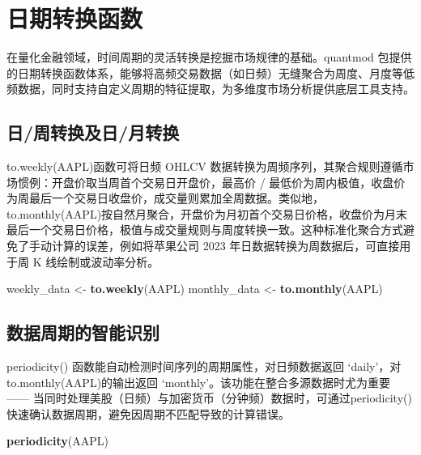 \documentclass[]{ctexbook}
\newenvironment{Shaded}{\begin{snugshade}}{\end{snugshade}}
\newcommand{\FunctionTok}[1]{\textcolor[rgb]{0.13,0.29,0.53}{\textbf{#1}}}
\newcommand{\NormalTok}[1]{#1}
\newcommand{\OtherTok}[1]{\textcolor[rgb]{0.56,0.35,0.01}{#1}}
\begin{document}
\section{日期转换函数}\label{ux65e5ux671fux8f6cux6362ux51fdux6570}

在量化金融领域，时间周期的灵活转换是挖掘市场规律的基础。quantmod 包提供的日期转换函数体系，能够将高频交易数据（如日频）无缝聚合为周度、月度等低频数据，同时支持自定义周期的特征提取，为多维度市场分析提供底层工具支持。

\subsection{日/周转换及日/月转换}\label{ux65e5ux5468ux8f6cux6362ux53caux65e5ux6708ux8f6cux6362}

to.weekly(AAPL)函数可将日频 OHLCV 数据转换为周频序列，其聚合规则遵循市场惯例：开盘价取当周首个交易日开盘价，最高价 / 最低价为周内极值，收盘价为周最后一个交易日收盘价，成交量则累加全周数据。类似地，to.monthly(AAPL)按自然月聚合，开盘价为月初首个交易日价格，收盘价为月末最后一个交易日价格，极值与成交量规则与周度转换一致。这种标准化聚合方式避免了手动计算的误差，例如将苹果公司 2023 年日数据转换为周数据后，可直接用于周 K 线绘制或波动率分析。

\begin{Shaded}
\begin{Highlighting}[]
\NormalTok{weekly\_data }\OtherTok{\textless{}{-}} \FunctionTok{to.weekly}\NormalTok{(AAPL)}
\NormalTok{monthly\_data }\OtherTok{\textless{}{-}} \FunctionTok{to.monthly}\NormalTok{(AAPL)}
\end{Highlighting}
\end{Shaded}

\subsection{数据周期的智能识别}\label{ux6570ux636eux5468ux671fux7684ux667aux80fdux8bc6ux522b}

periodicity() 函数能自动检测时间序列的周期属性，对日频数据返回 `daily'，对to.monthly(AAPL)的输出返回 `monthly'。该功能在整合多源数据时尤为重要 ------ 当同时处理美股（日频）与加密货币（分钟频）数据时，可通过periodicity()快速确认数据周期，避免因周期不匹配导致的计算错误。

\begin{Shaded}
\begin{Highlighting}[]
\FunctionTok{periodicity}\NormalTok{(AAPL)}
\end{Highlighting}
\end{Shaded}
\end{document}
